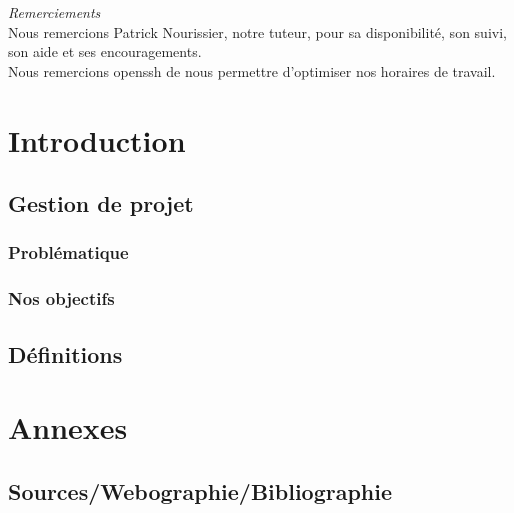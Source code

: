 \documentclass[a4paper,10pt,one side,titlepage]{report}
\begin{document}




\emph{\Large Remerciements}
\\[2cm]
Nous remercions Patrick Nourissier, notre tuteur, pour sa disponibilité, son 
suivi, son aide et ses encouragements. 
\\[1cm]
Nous remercions openssh de nous permettre d'optimiser nos horaires de travail.


\setcounter{tocdepth}{1}
\tableofcontents

\part{Introduction}
\chapter{Gestion de projet}
\section{Problématique}
\section{Nos objectifs}
\chapter{Définitions}
\part{Annexes}
\chapter{Sources/Webographie/Bibliographie}



\printglossaries
\end{document}
